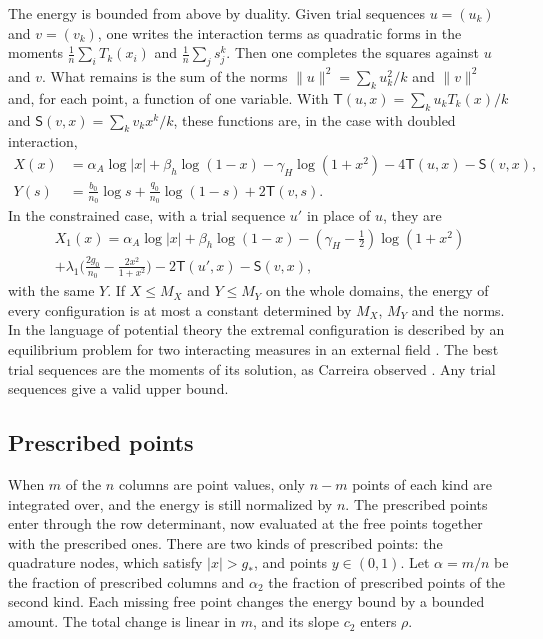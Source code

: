 The energy is bounded from above by duality. Given trial sequences $u=(u_k)$ and $v=(v_k)$, one writes the
interaction terms as quadratic forms in the moments $\frac1n\sum_iT_k(x_i)$ and $\frac1n\sum_js_j^k$. Then one
completes the squares against $u$ and $v$. What remains is the sum of the norms $\|u\|^2=\sum_ku_k^2/k$ and
$\|v\|^2$ and, for each point, a function of one variable. With $\mathsf T(u,x)=\sum_ku_kT_k(x)/k$ and
$\mathsf S(v,x)=\sum_kv_kx^k/k$, these functions are, in the case with doubled interaction,
\begin{align*}
 X(x)&=\alpha_A\log|x|+\beta_h\log(1-x)-\gamma_H\log(1+x^2)-4\mathsf T(u,x)-\mathsf S(v,x),\\
 Y(s)&=\tfrac{b_0}{n_0}\log s+\tfrac{q_0}{n_0}\log(1-s)+2\mathsf T(v,s).
\end{align*}
In the constrained case, with a trial sequence $u'$ in place of $u$, they are
\begin{multline*}
 X_1(x)=\alpha_A\log|x|+\beta_h\log(1-x)-(\gamma_H-\tfrac12)\log(1+x^2)\\
 +\lambda_1\bigl(\tfrac{2g_0}{n_0}-\tfrac{2x^2}{1+x^2}\bigr)-2\mathsf T(u',x)-\mathsf S(v,x),
\end{multline*}
with the same $Y$. If $X\le M_X$ and $Y\le M_Y$ on the whole domains, the energy of every configuration is at
most a constant determined by $M_X$, $M_Y$ and the norms. In the language of potential theory the extremal
configuration is described by an equilibrium problem for two interacting measures in an external field
\cite{SaffTotik}. The best trial sequences are the moments of its solution, as Carreira observed
\cite{Carreira2026}. Any trial sequences give a valid upper bound.

\subsection{Prescribed points}
When $m$ of the $n$ columns are point values, only $n-m$ points of each kind are integrated over, and the
energy is still normalized by $n$. The prescribed points enter through the row determinant, now evaluated
at the free points together with the prescribed ones. There are two kinds of prescribed points: the
quadrature nodes, which satisfy $|x|>g_*$, and points $y\in(0,1)$. Let $\alpha=m/n$ be the fraction of
prescribed columns and $\alpha_2$ the fraction of prescribed points of the second kind. Each missing free point
changes the energy bound by a bounded amount. The total change is linear in $m$, and its slope $c_2$ enters
$\rho$.

